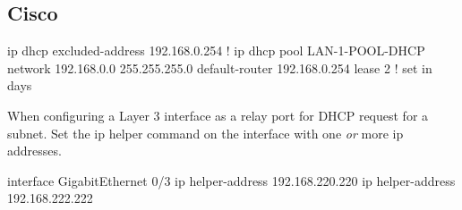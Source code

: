\subsection{Cisco}

\begin{txt}
ip dhcp excluded-address 192.168.0.254
!
ip dhcp pool LAN-1-POOL-DHCP
 network 192.168.0.0 255.255.255.0
 default-router 192.168.0.254
 lease 2 ! set in days
\end{txt}

When configuring a Layer 3 interface as a relay port for DHCP request for a subnet. Set the ip helper command on the interface with one \textit{or} more ip addresses.

\begin{txt}
interface GigabitEthernet 0/3
 ip helper-address 192.168.220.220
 ip helper-address 192.168.222.222
\end{txt}
